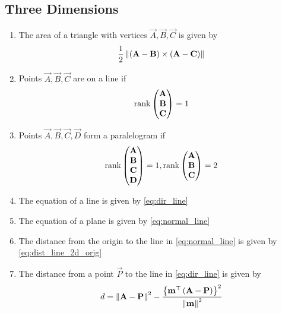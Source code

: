 \documentclass[journal,12pt,onecolumn]{IEEEtran}
\renewcommand\thesection{\arabic{section}}
\renewcommand\thesubsection{\thesection.\arabic{subsection}}
\begin{document}
\subsection{Three Dimensions}
\renewcommand{\theequation}{\theenumi}
\begin{enumerate}[label=\thesubsection.\arabic*.,ref=\thesubsection.\theenumi]
\item The area of a triangle with vertices $\vec{A}, \vec{B}, \vec{C}$ is given by 
\begin{align}
  \label{eq:area3d}
 \frac{1}{2} \left\lVert\left(\mathbf{A} - \mathbf{B}\right) \times \left(\mathbf{A} - \mathbf{C}\right)\right\rVert
\end{align}

\item Points $\vec{A}, \vec{B}, \vec{C}$ are on a line if 
\begin{align}
  \label{eq:line_rank}
  \text{rank}\begin{pmatrix}\mathbf{A} \\ \mathbf{B} \\ \mathbf{C} \end{pmatrix}  = 1
\end{align}
\item Points $\vec{A}, \vec{B}, \vec{C}, \vec{D}$ form a paralelogram if 
\begin{align}
  \label{eq:parallelgm_rank}
  \text{rank}\begin{pmatrix}\mathbf{A} \\ \mathbf{B} \\ \mathbf{C} \\ \mathbf{D}  \end{pmatrix}  = 1, 
  \text{rank}\begin{pmatrix}\mathbf{A} \\ \mathbf{B} \\ \mathbf{C} \end{pmatrix}  = 2
\end{align}
\item The equation of a line  is given by  
	\eqref{eq:dir_line}
	\item The equation of a plane is given by
	\eqref{eq:normal_line}
	\item The distance from the origin to the line  in 
	\eqref{eq:normal_line}
	is given by 
	\eqref{eq:dist_line_2d_orig}
\item The distance from a point $\vec{P}$  to the line in 
	\eqref{eq:dir_line} is given by 
\begin{align}
	\label{dist_3d_def_final}
		d = \left\lVert\mathbf{A} -\mathbf{P}\right\rVert^2 - \frac{\left\{\mathbf{m}^{\top}\left(\mathbf{A}-\mathbf{P} 
	\right)\right\}^2}{\left\lVert\mathbf{m}\right\rVert^2}
		\end{align}

\end{enumerate}
\end{document}
